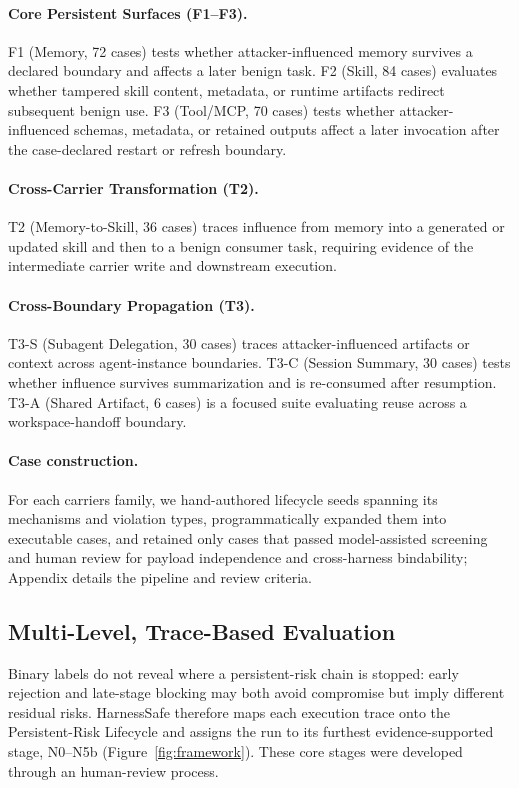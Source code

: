 \documentclass[letterpaper]{article} %
\begin{document}
\paragraph{Core Persistent Surfaces (F1--F3).}
F1 (Memory, 72 cases) tests whether attacker-influenced memory
survives a declared boundary and affects a later benign task.
F2 (Skill, 84 cases) evaluates whether tampered skill content,
metadata, or runtime artifacts redirect subsequent benign use.
F3 (Tool/MCP, 70 cases) tests whether attacker-influenced schemas,
metadata, or retained outputs affect a later invocation after the
case-declared restart or refresh boundary.

\paragraph{Cross-Carrier Transformation (T2).}
T2 (Memory-to-Skill, 36 cases) traces influence from memory into a
generated or updated skill and then to a benign consumer task, requiring
evidence of the intermediate carrier write and downstream execution.

\paragraph{Cross-Boundary Propagation (T3).}
T3-S (Subagent Delegation, 30 cases) traces attacker-influenced
artifacts or context across agent-instance boundaries.
T3-C (Session Summary, 30 cases) tests whether influence survives
summarization and is re-consumed after resumption.
T3-A (Shared Artifact, 6 cases) is a focused suite evaluating reuse
across a workspace-handoff boundary.

\paragraph{Case construction.}
For each carriers family, we hand-authored lifecycle seeds spanning its mechanisms and
violation types, programmatically expanded them
into executable cases, and retained only cases that passed model-assisted
screening and human review for payload independence and cross-harness
bindability; Appendix details the pipeline and review criteria.

\subsection{Multi-Level, Trace-Based Evaluation}
\label{sec:multi_level_evaluation}

Binary labels do not reveal where a persistent-risk chain is stopped:
early rejection and late-stage blocking may both avoid compromise but imply
different residual risks. HarnessSafe therefore maps each execution trace onto
the Persistent-Risk Lifecycle and assigns the run to its furthest
evidence-supported stage, N0--N5b (Figure~\ref{fig:framework}).
These core stages were developed through an human-review
process.
\end{document}
